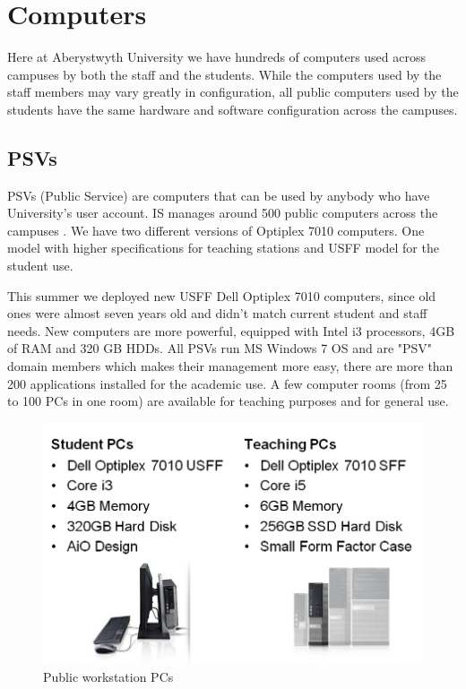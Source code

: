 \documentclass[10pt,a4paper,headinclude=true]{report}
\begin{document}
\section{Computers}
Here at Aberystwyth University we have hundreds of computers used across campuses by both the staff and the students. While the computers used by the staff members may vary greatly in configuration, all public computers used by the students have the same hardware and software configuration across the campuses.
\subsection{PSVs}
PSVs (Public Service) are computers that can be used by anybody who have University's user account. IS manages around 500 public computers across the campuses \cite{PSVs2}. We have two different versions of Optiplex 7010 computers. One model with higher specifications for teaching stations and USFF model for the student use. 

This summer we deployed new USFF Dell Optiplex 7010 \cite{PSVs} computers, since old ones were almost seven years old and didn't match current student and staff needs. New computers are more powerful, equipped with Intel i3 processors, 4GB of RAM and 320 GB HDDs. All PSVs run MS Windows 7 OS and are "PSV" domain members which makes their management more easy, there are more than 200 applications installed for the academic use. A few computer rooms (from 25 to 100 PCs in one room) are available for teaching purposes and for general use.
\begin{figure}[H]
\centering
\centerline{\includegraphics[scale=0.5]{./PSVs}}
\caption{Public workstation PCs \cite{PSVs}}
\label{fig:PSVs}
\end{figure}
\end{document}
